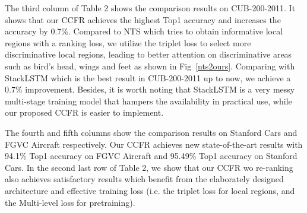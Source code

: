 \documentclass[10pt,twocolumn,letterpaper]{article}
\begin{document}
The third column of Table 2 shows the comparison results on CUB-200-2011. It shows that our CCFR achieves the highest Top1 accuracy and increases the accuracy by 0.7\%. Compared to NTS\cite{YangLWHGW18} which tries to obtain informative local regions with a ranking loss, we utilize the triplet loss to select more discriminative local regions, leading to better attention on discriminative areas such as bird’s head, wings and feet as shown in Fig~\ref{nts2ours}. Comparing with StackLSTM\cite{GeLY19} which is the best result in CUB-200-2011 up to now, we achieve a 0.7\% improvement. Besides, it is worth noting that StackLSTM is a very messy multi-stage training model that hampers the availability in practical use, while our proposed CCFR is easier to implement.

The fourth and fifth columns show the comparison results on Stanford Cars and FGVC Aircraft respectively. Our CCFR achieves new state-of-the-art results with 94.1\% Top1 accuracy on FGVC Aircraft and 95.49\% Top1 accuracy on Stanford Cars. In the second last row of Table 2, we show that our CCFR wo re-ranking also achieves satisfactory results which benefit from the elaborately designed architecture and effective training loss (i.e. the triplet loss for local regions, and the Multi-level loss for pretraining). 
\end{document}
